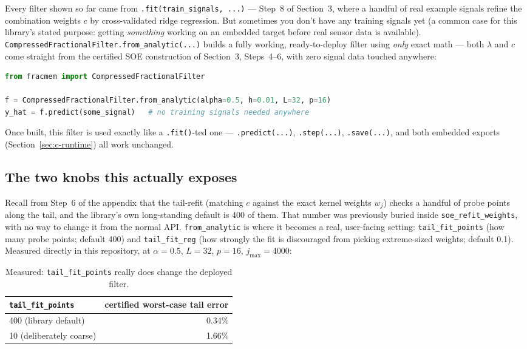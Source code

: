 \documentclass[11pt]{article}
\begin{document}
Every filter shown so far came from \texttt{.fit(train\_signals, ...)} --- Step~8 of Section~3, where a handful of real example signals refine the combination weights $c$ by cross-validated ridge regression. But sometimes you don't have any training signals yet (a common case for this library's stated purpose: getting \emph{something} working on an embedded target before real sensor data is available). \texttt{CompressedFractionalFilter.from\_analytic(...)} builds a fully working, ready-to-deploy filter using \emph{only} exact math --- both $\lambda$ and $c$ come straight from the certified SOE construction of Section~3, Steps~4--6, with zero signal data touched anywhere:

\begin{lstlisting}[language=Python]
from fracmem import CompressedFractionalFilter

f = CompressedFractionalFilter.from_analytic(alpha=0.5, h=0.01, L=32, p=16)
y_hat = f.predict(some_signal)   # no training signals needed anywhere
\end{lstlisting}

Once built, this filter is used exactly like a \texttt{.fit()}-ted one --- \texttt{.predict(...)}, \texttt{.step(...)}, \texttt{.save(...)}, and both embedded exports (Section~\ref{sec:c-runtime}) all work unchanged.

\subsection{The two knobs this actually exposes}
Recall from Step~6 of the appendix that the tail-refit (matching $c$ against the exact kernel weights $w_j$) checks a handful of probe points along the tail, and the library's own long-standing default is 400 of them. That number was previously buried inside \texttt{soe\_refit\_weights}, with no way to change it from the normal API. \texttt{from\_analytic} is where it becomes a real, user-facing setting: \texttt{tail\_fit\_points} (how many probe points; default 400) and \texttt{tail\_fit\_reg} (how strongly the fit is discouraged from picking extreme-sized weights; default 0.1). Measured directly in this repository, at $\alpha=0.5$, $L=32$, $p=16$, $j_{\max}=4000$:

\begin{table}[h]
\centering
\caption{Measured: \texttt{tail\_fit\_points} really does change the deployed filter.}
\begin{tabular}{lr}
\toprule
\texttt{tail\_fit\_points} & certified worst-case tail error \\
\midrule
400 (library default) & 0.34\% \\
10 (deliberately coarse) & 1.66\% \\
\bottomrule
\end{tabular}
\end{table}
\end{document}
